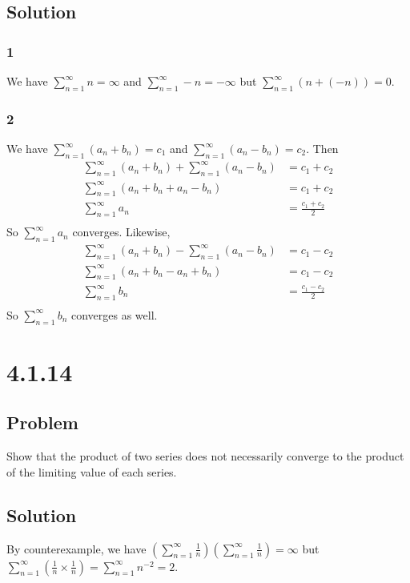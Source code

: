 \documentclass[12pt]{article}
\newcommand{\round}[1]{\left(       #1 \right)      }
\begin{document}
\subsection*{Solution}

\subsubsection*{1}
We have $\sum_{n=1}^\infty n = \infty$ and $\sum_{n=1}^\infty -n = -\infty$ but $\sum_{n=1}^\infty (n + (-n)) = 0$.

\subsubsection*{2}
We have $\sum_{n=1}^\infty (a_n + b_n) = c_1$ and $\sum_{n=1}^\infty (a_n - b_n) = c_2$. Then
\begin{align*}
    \sum_{n=1}^\infty (a_n + b_n) + \sum_{n=1}^\infty (a_n - b_n) &= c_1 + c_2 \\
    \sum_{n=1}^\infty (a_n + b_n + a_n - b_n) &= c_1 + c_2 \\
    \sum_{n=1}^\infty a_n &= \frac{c_1 + c_2}{2} \\
\end{align*}
So $\sum_{n=1}^\infty a_n$ converges. Likewise,
\begin{align*}
    \sum_{n=1}^\infty (a_n + b_n) - \sum_{n=1}^\infty (a_n - b_n) &= c_1 - c_2 \\
    \sum_{n=1}^\infty (a_n + b_n - a_n + b_n) &= c_1 - c_2 \\
    \sum_{n=1}^\infty b_n &= \frac{c_1 - c_2}{2} \\
\end{align*}
So $\sum_{n=1}^\infty b_n$ converges as well.



\section*{4.1.14}

\subsection*{Problem}
Show that the product of two series does not necessarily converge to the product of the limiting value of each series.

\subsection*{Solution}
By counterexample, we have $\round{\sum_{n=1}^\infty \frac{1}{n}} \round{\sum_{n=1}^\infty \frac{1}{n}} = \infty$ but $\sum_{n=1}^\infty \round{\frac{1}{n} \times \frac{1}{n}} = \sum_{n=1}^\infty n^{-2} = 2$.
\end{document}
